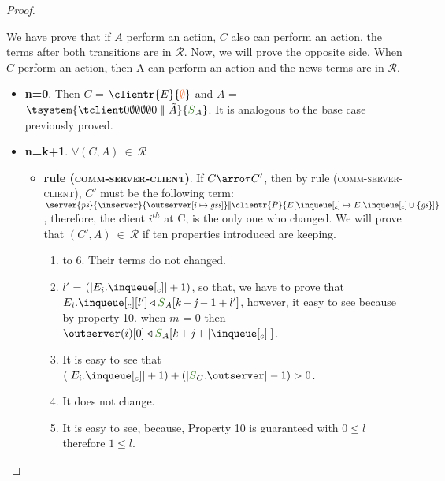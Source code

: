 \begin{proof}
\begin{itemize}
\begin{itemize}
\end{itemize}

\end{itemize}

We have prove that if $A$ perform an action, $C$ also can perform an action, the terms after both transitions are in $\mathcal{R}$. Now, we will prove the opposite side. When $C$ perform an action, then A can perform an action and the news terms are in $\mathcal{R}$.


\begin{itemize}
   \item{\bf n=0}. Then $C$ = $\clientr{E}{\initialstate}$ and $A$ = $\tsystem{\tclienti{0}{\emptyset}{\emptyset}{\emptyset}{\emptyset}{0}\ \bigpar\ \tilde{A}}{\queuemessage_A}$. It is analogous to the base case previously proved.
			
   \item{\bf n=k+1}. $\forall (C,A) \ \in \ \mathcal{R}$
	
			
			\begin{itemize}
				\item {\bf rule (\textsc{comm-server-client})}. If $C \arroi{\tau} C'$, then by rule (\textsc{\footnotesize{comm-server-client}}), $C'$ must be the following term: $\server{\state}{\inserver}{\update{\outserver}{i}{\gss}} \bigpar 
		\clientr{P}{\update{E}{\inclient}{E.\inclient \cup \{\gs\}}}$, therefore, the client $i^{th}$ at C, is the only one who changed. We will prove that $(C',A) \ \in \ \mathcal{R}$ if ten properties introduced are keeping.				
					\begin{enumerate}
						\item to 6. Their terms do not changed.
						\setcounter{enumi}{6}	
							\item $l'$ = $(|E_{i}.\inclient| + 1)$, so that, we have to prove that $E_{i}.\inclient[l'] \triangleleft \queuemessage_A[\tknown + \treceivebuffer - 1 + l']$, however, it easy to see because by property 10. when $m$ = 0 then $\outserver(i)[0] \triangleleft \queuemessage_A[\tknown + \treceivebuffer + |\inclient|]$.
						\item It is easy to see that $(|E_{i}.\inclient| + 1) + (|\queuemessage_C.\outserver|-1) > 0$.
						\item It does not change.
						\item It is easy to see, because, Property 10 is guaranteed with $0 \leq l$ therefore $1 \leq l$. 
					\end{enumerate}
					

\end{itemize}
\end{itemize}
\end{proof}

